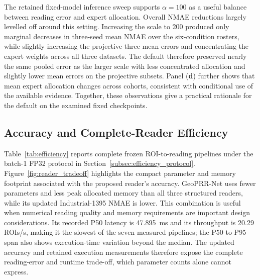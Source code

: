 \documentclass[electronics,article,submit,oneauthor]{Definitions/mdpi}
\newcommand{\modelname}{GeoPRR-Net\xspace}
\begin{document}
The retained fixed-model inference sweep supports $\alpha=100$ as a useful balance between reading error and expert allocation. Overall NMAE reductions largely levelled off around this setting. Increasing the scale to 200 produced only marginal decreases in three-seed mean NMAE over the six-condition rosters, while slightly increasing the projective-three mean errors and concentrating the expert weights across all three datasets. The default therefore preserved nearly the same pooled error as the larger scale with less concentrated allocation and slightly lower mean errors on the projective subsets. Panel (\textbf{d}) further shows that mean expert allocation changes across cohorts, consistent with conditional use of the available evidence. Together, these observations give a practical rationale for the default on the examined fixed checkpoints.

\subsection{Accuracy and Complete-Reader Efficiency}
\label{subsec:efficiency_results}

Table~\ref{tab:efficiency} reports complete frozen ROI-to-reading pipelines under the batch-1 FP32 protocol in Section~\ref{subsec:efficiency_protocol}. Figure~\ref{fig:reader_tradeoff} highlights the compact parameter and memory footprint associated with the proposed reader's accuracy. \modelname uses fewer parameters and less peak allocated memory than all three structured readers, while its updated Industrial-1395 NMAE is lower. This combination is useful when numerical reading quality and memory requirements are important design considerations. Its recorded P50 latency is 47.895~ms and its throughput is 20.29 ROIs/s, making it the slowest of the seven measured pipelines; the P50-to-P95 span also shows execution-time variation beyond the median. The updated accuracy and retained execution measurements therefore expose the complete reading-error and runtime trade-off, which parameter counts alone cannot express.
\end{document}
